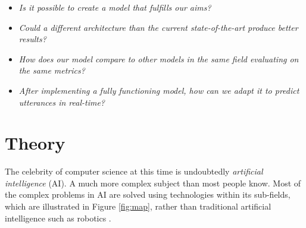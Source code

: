 \documentclass[nofilelist]{cslthse-msc}
\begin{document}
\begin{itemize}
    \item \textit{Is it possible to create a model that fulfills our aims?}
    \item \textit{Could a different architecture than the current state-of-the-art produce better results?}
    \item \textit{How does our model compare to other models in the same field evaluating on the same metrics?}
    \item \textit{After implementing a fully functioning model, how can we adapt it to predict utterances in real-time?}
\end{itemize}












\chapter{Theory}

The celebrity of computer science at this time is undoubtedly \emph{artificial intelligence} (AI). A much more complex subject than most people know. Most of the complex problems in AI are solved using technologies within its sub-fields, which are illustrated in Figure \ref{fig:map}, rather than traditional artificial intelligence such as robotics \citep{bajwa_2020}. 

\end{document}
